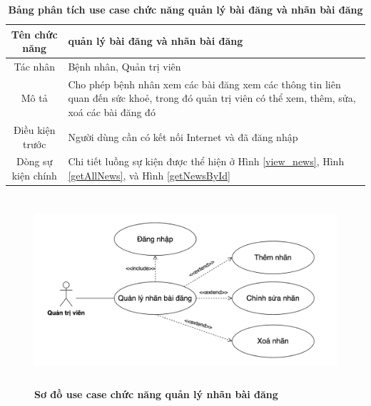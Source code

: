   \begin{table}[H]
    \caption{\bfseries \fontsize{12pt}{0pt}\selectfont Bảng phân tích use case chức năng quản lý bài đăng và nhãn bài đăng}
    \centering
    \begin{tabularx}{0.9\textwidth}{|c|X|}
      \hline
      \textbf{Tên chức năng} & \textbf{quản lý bài đăng và nhãn bài đăng} \\
      \hline
      Tác nhân & Bệnh nhân, Quản trị viên \\
      \hline
      Mô tả & Cho phép bệnh nhân xem các bài đăng xem các thông tin liên quan đến sức khoẻ, trong đó quản trị viên có thể
      xem, thêm, sửa, xoá các bài đăng đó  \\
      \hline
      Điều kiện trước & Người dùng cần có kết nối Internet và đã đăng nhập \\
      \hline
      Dòng sự kiện chính & 
        Chi tiết luồng sự kiện được thể hiện ở Hình \ref{view_news}, Hình \ref{getAllNews},
        và Hình \ref{getNewsById} \\
      \hline
    \end{tabularx}
  \end{table}

  \begin{figure}[H]
    \centering
    \includegraphics[width=15cm,height=7cm]{Images/use_case/use_case_category_news.png}
    \caption[Sơ đồ use case chức năng quản lý nhãn bài đăng]{\bfseries \fontsize{12pt}{0pt}
    \selectfont Sơ đồ use case chức năng quản lý nhãn bài đăng}
    \label{use_case_category_news} %
  \end{figure}

